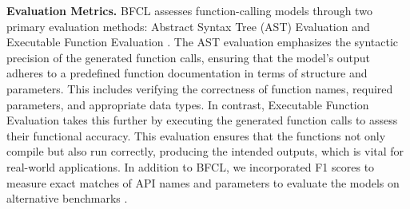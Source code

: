 \documentclass{article}
\begin{document}
\textbf{Evaluation Metrics.} BFCL assesses function-calling models through two primary evaluation methods: Abstract Syntax Tree (AST) Evaluation and Executable Function Evaluation \citep{berkeley-function-calling-leaderboard}. The AST evaluation emphasizes the syntactic precision of the generated function calls, ensuring that the model's output adheres to a predefined function documentation in terms of structure and parameters. This includes verifying the correctness of function names, required parameters, and appropriate data types. In contrast, Executable Function Evaluation takes this further by executing the generated function calls to assess their functional accuracy. This evaluation ensures that the functions not only compile but also run correctly, producing the intended outputs, which is vital for real-world applications. In addition to BFCL, we incorporated F1 scores to measure exact matches of API names and parameters to evaluate the models on alternative benchmarks \citep{abdelaziz2024granite}. 





\end{document}
